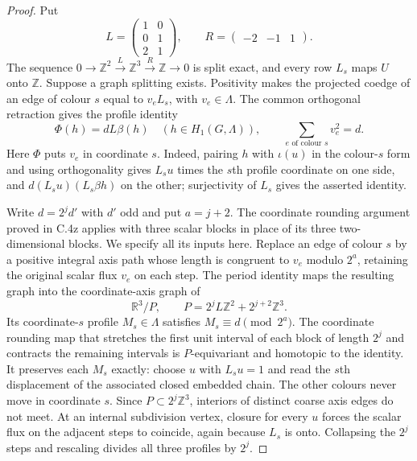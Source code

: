 \begin{proof}
Put
\[
 L=\begin{pmatrix}1&0\\0&1\\2&1\end{pmatrix},
 \qquad R=\begin{pmatrix}-2&-1&1\end{pmatrix}.
\]
The sequence $0\to\mathbb Z^2\xrightarrow L\mathbb Z^3
\xrightarrow R\mathbb Z\to0$ is split exact, and every row $L_s$
maps $U$ onto $\mathbb Z$. Suppose a graph splitting exists.
Positivity makes the projected coedge of an edge of colour $s$
equal to $v_eL_s$, with $v_e\in\Lambda$. The common orthogonal
retraction gives the profile identity
\[
 \Phi(h)=dL\beta(h)\quad(h\in H_1(G,\Lambda)),
 \qquad \sum_{e\text{ of colour }s}v_e^2=d.
\]
Here $\Phi$ puts $v_e$ in coordinate $s$. Indeed, pairing $h$
with $\iota(u)$ in the colour-$s$ form and using orthogonality
gives $L_su$ times the $s$th profile coordinate on one side, and
$d(L_su)(L_s\beta h)$ on the other; surjectivity of $L_s$ gives
the asserted identity.

Write $d=2^j d'$ with $d'$ odd and put $a=j+2$. The coordinate
rounding argument proved in C.4z applies with three scalar blocks
in place of its three two-dimensional blocks. We specify all its
inputs here. Replace an edge of colour $s$ by a positive integral
axis path whose length is congruent to $v_e$ modulo $2^a$, retaining
the original scalar flux $v_e$ on each step. The period identity
maps the resulting graph into the coordinate-axis graph of
\[
 \mathbb R^3/P,
 \qquad P=2^jL\mathbb Z^2+2^{j+2}\mathbb Z^3.
\]
Its coordinate-$s$ profile $M_s\in\Lambda$ satisfies
$M_s\equiv d\pmod{2^a}$. The coordinate rounding map that
stretches the first unit interval of each block of length $2^j$
and contracts the remaining intervals is $P$-equivariant and
homotopic to the identity. It preserves each $M_s$ exactly:
choose $u$ with $L_su=1$ and read the $s$th displacement of the
associated closed embedded chain. The other colours never move
in coordinate $s$. Since $P\subset2^j\mathbb Z^3$, interiors
of distinct coarse axis edges do not meet. At an internal
subdivision vertex, closure for every $u$ forces the scalar
flux on the adjacent steps to coincide, again because $L_s$
is onto. Collapsing the $2^j$ steps and rescaling divides all
three profiles by $2^j$.


\end{proof}
